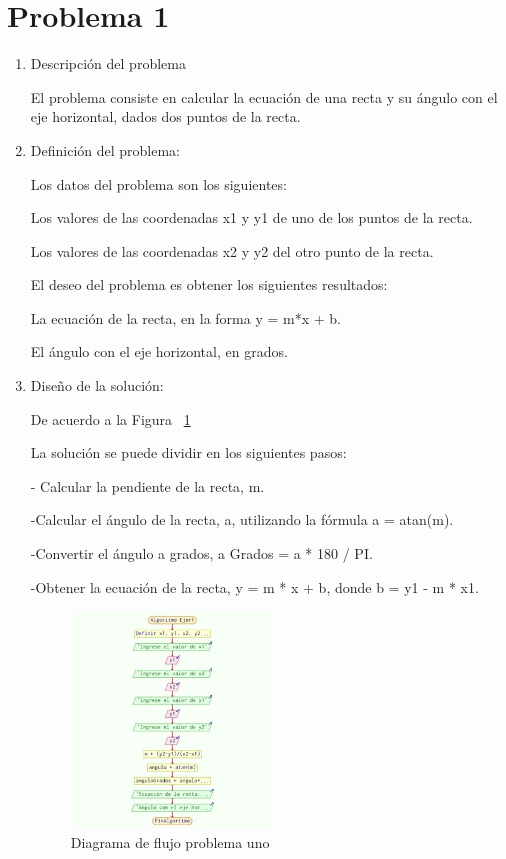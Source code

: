 \documentclass{IEEEcsmag}
\begin{document}
\section{Problema 1}
\begin{enumerate}
    
\item  Descripción del problema

El problema consiste en calcular la ecuación de una recta y su ángulo con el eje horizontal, dados dos puntos de la recta.\newline

\item  Definición del problema:

Los datos del problema son los siguientes:

Los valores de las coordenadas x1 y y1 de uno de los puntos de la recta.
 
Los valores de las coordenadas x2 y y2 del 
otro punto de la recta.

El deseo del problema es obtener los siguientes resultados:

La ecuación de la recta, en la forma y = m*x + b.
 
El ángulo con el eje horizontal, en grados.\newline

\item  Diseño de la solución:


De acuerdo a la Figura ~\ref{fig:diagramaP1}


La solución se puede dividir en los siguientes pasos:

 - Calcular la pendiente de la recta, m.

 -Calcular el ángulo de la recta, a, utilizando la fórmula a = atan(m).

 -Convertir el ángulo a grados, a Grados = a * 180 / PI.

-Obtener la ecuación de la recta, y = m * x + b, donde b = y1 - m * x1.\newline

\begin{figure}
\caption{Diagrama de flujo problema uno}
\centerline{\includegraphics[width=0.5\textwidth]{./latex-imagenes/diagramaProb1.jpg}}
\vspace*{7pt}
\label{fig:diagramaP1}
\end{figure}


\end{enumerate}
\end{document}
